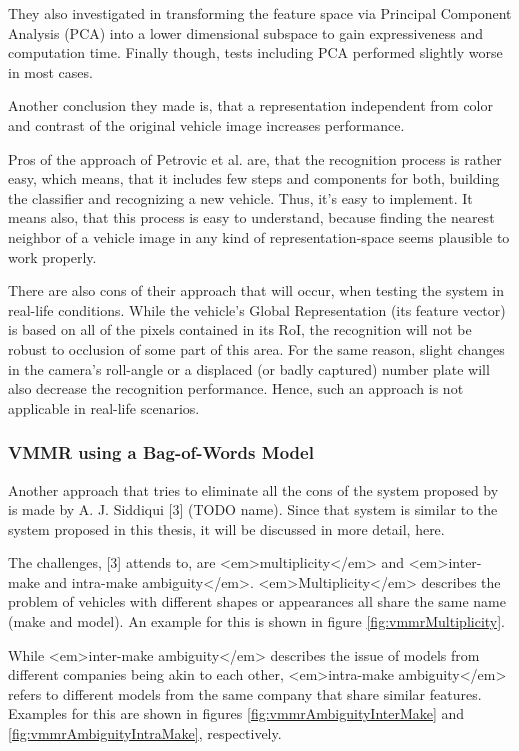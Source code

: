 They also investigated in transforming the feature space via Principal Component Analysis (PCA) into a lower dimensional subspace to gain expressiveness and computation time. Finally though, tests including PCA performed slightly worse in most cases.

Another conclusion they made is, that a representation independent from color and contrast of the original vehicle image increases performance.

Pros of the approach of Petrovic et al. are, that the recognition process is rather easy, which means, that it includes few steps and components for both, building the classifier and recognizing a new vehicle. Thus, it’s easy to implement. It means also, that this process is easy to understand, because finding the nearest neighbor of a vehicle image in any kind of representation-space seems plausible to work properly.

There are also cons of their approach that will occur, when testing the system in real-life conditions. While the vehicle’s Global Representation (its feature vector) is based on all of the pixels contained in its RoI, the recognition will not be robust to occlusion of some part of this area. For the same reason, slight changes in the camera’s roll-angle or a displaced (or badly captured) number plate will also decrease the recognition performance. Hence, such an approach is not applicable in real-life scenarios.

\subsubsection{VMMR using a Bag-of-Words Model}
Another approach that tries to eliminate all the cons of the system proposed by \citeauthor{petrovic2004analysis} is made by A. J. Siddiqui [3] (TODO name). Since that system is similar to the system proposed in this thesis, it will be discussed in more detail, here.

The challenges, [3] attends to, are <em>multiplicity</em> and <em>inter-make and intra-make ambiguity</em>. <em>Multiplicity</em> describes the problem of vehicles with different shapes or appearances all share the same name (make and model). An example for this is shown in figure \ref{fig:vmmrMultiplicity}.

While <em>inter-make ambiguity</em> describes the issue of models from different companies being akin to each other, <em>intra-make ambiguity</em> refers to different models from the same company that share similar features. Examples for this are shown in figures \ref{fig:vmmrAmbiguityInterMake} and \ref{fig:vmmrAmbiguityIntraMake}, respectively.


